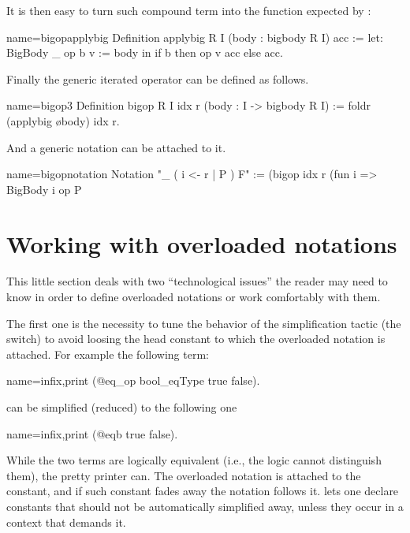It is then easy to turn such compound term into the function expected
by :

\begin{coq}{name=bigopapplybig}{}
Definition applybig {R I} (body : bigbody R I) acc :=
  let: BigBody _ op b v := body in if b then op v acc else acc.
\end{coq}

Finally the generic iterated operator can be defined as follows.

\begin{coq}{name=bigop3}{}
Definition bigop R I idx r (body : I -> bigbody R I) :=
  foldr (applybig \o body) idx r.
\end{coq}

And a generic notation can be attached to it.

\begin{coq}{name=bigopnotation}{}
Notation "\big [ op / idx ]_ ( i <- r | P ) F" :=
  (bigop idx r (fun i => BigBody i op P%
\end{coq}

\section{Working with overloaded notations}

This little section deals with two ``technological issues'' the reader
may need to know in order to define overloaded notations or work
comfortably with them.

The first one is the necessity to tune the behavior of the
simplification tactic (the \C{/=} switch) to avoid loosing the
head constant to which the overloaded notation is attached.
For example the following term:

\begin{coq}{name=infix,print}{}
  (@eq_op bool_eqType true false).
\end{coq}
can be simplified (reduced) to the following one

\begin{coq}{name=infix,print}{}
  (@eqb true false).
\end{coq}

While the two terms are logically equivalent (i.e., the logic cannot
distinguish them), the pretty printer can.  The overloaded
\C{==} notation is attached to the  constant, and if such
constant fades away the notation follows it.  \Coq{} lets one declare
constants that should not be automatically simplified away, unless
they occur in a context that demands it.

